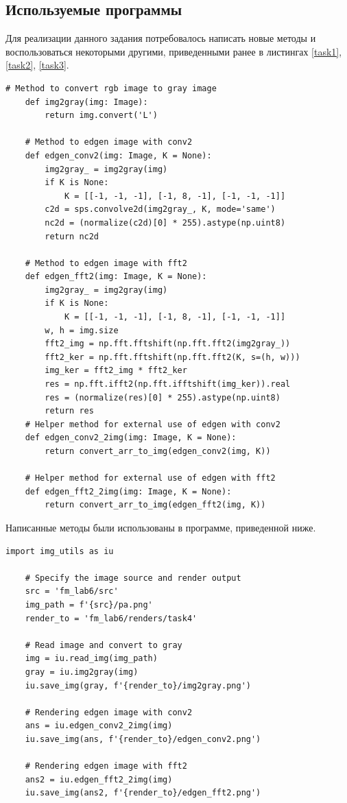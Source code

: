 \documentclass[a4paper, 12pt]{article}
\begin{document}
    \subsection{Используемые программы}
    Для реализации данного задания потребовалось написать новые методы и воспользоваться некоторыми другими, приведенными ранее
    в листингах \ref{task1}, \ref{task2}, \ref{task3}.
    \begin{lstlisting}[label=task4, caption={Программные методы, необходимые для задания 4}]
    # Method to convert rgb image to gray image
    def img2gray(img: Image):
        return img.convert('L')

    # Method to edgen image with conv2
    def edgen_conv2(img: Image, K = None):
        img2gray_ = img2gray(img)
        if K is None:
            K = [[-1, -1, -1], [-1, 8, -1], [-1, -1, -1]]
        c2d = sps.convolve2d(img2gray_, K, mode='same')
        nc2d = (normalize(c2d)[0] * 255).astype(np.uint8)
        return nc2d
    
    # Method to edgen image with fft2
    def edgen_fft2(img: Image, K = None):
        img2gray_ = img2gray(img)
        if K is None:
            K = [[-1, -1, -1], [-1, 8, -1], [-1, -1, -1]]
        w, h = img.size
        fft2_img = np.fft.fftshift(np.fft.fft2(img2gray_))
        fft2_ker = np.fft.fftshift(np.fft.fft2(K, s=(h, w)))
        img_ker = fft2_img * fft2_ker
        res = np.fft.ifft2(np.fft.ifftshift(img_ker)).real
        res = (normalize(res)[0] * 255).astype(np.uint8)
        return res
    # Helper method for external use of edgen with conv2
    def edgen_conv2_2img(img: Image, K = None):
        return convert_arr_to_img(edgen_conv2(img, K))
    
    # Helper method for external use of edgen with fft2
    def edgen_fft2_2img(img: Image, K = None):
        return convert_arr_to_img(edgen_fft2(img, K))
    \end{lstlisting}


    Написанные методы были использованы в программе, приведенной ниже.
    \begin{lstlisting}[label=task44, caption={Реализация задания 4}]
    import img_utils as iu

    # Specify the image source and render output
    src = 'fm_lab6/src'
    img_path = f'{src}/pa.png'
    render_to = 'fm_lab6/renders/task4'

    # Read image and convert to gray
    img = iu.read_img(img_path)
    gray = iu.img2gray(img)
    iu.save_img(gray, f'{render_to}/img2gray.png')

    # Rendering edgen image with conv2
    ans = iu.edgen_conv2_2img(img)
    iu.save_img(ans, f'{render_to}/edgen_conv2.png')

    # Rendering edgen image with fft2
    ans2 = iu.edgen_fft2_2img(img)
    iu.save_img(ans2, f'{render_to}/edgen_fft2.png')
    \end{lstlisting}
\end{document}
